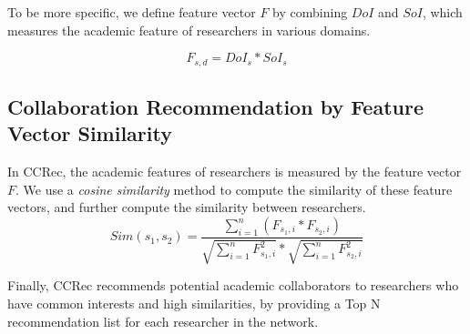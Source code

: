 \documentclass{chi-ext}
\begin{document}
To be more specific, we define feature vector $F$ by combining $DoI$ and $SoI$, which measures the academic feature of researchers in various domains.

\begin{equation}
F_{s,d}=DoI_{s}*SoI_{s}
\end{equation}

\subsection{Collaboration Recommendation by Feature Vector Similarity}
In CCRec, the academic features of researchers is measured by the feature vector $F$. We use a \emph{cosine similarity} method to compute the similarity of these feature vectors, and further compute the similarity between researchers.
\begin{equation}
Sim(s_{1},s_{2})=\frac{\sum_{i=1}^{n}(F_{s_{1},i}*F_{s_{2},i})}{\sqrt{\sum_{i=1}^{n}F_{s_{1},i}^2}*\sqrt{\sum_{i=1}^{n}F_{s_{2},i}^2}}
\end{equation}

Finally, CCRec recommends potential academic collaborators to researchers who have common interests and high similarities, by providing a Top N recommendation list for each researcher in the network.
\end{document}
